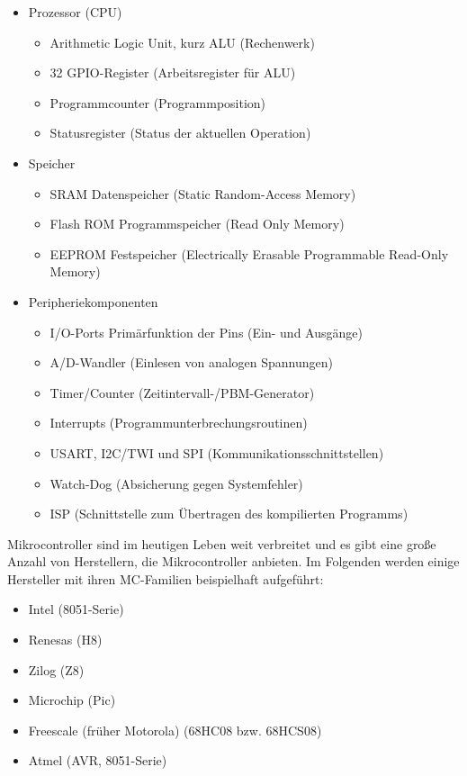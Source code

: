 \begin{itemize}
\item Prozessor (CPU)
\begin{itemize}
          \item Arithmetic Logic Unit, kurz ALU (Rechenwerk)
          \item 32 GPIO-Register (Arbeitsregister für ALU)
          \item Programmcounter (Programmposition)
					\item Statusregister (Status der aktuellen Operation) 
\end{itemize}
\item Speicher
\begin{itemize}
          \item SRAM Datenspeicher (Static Random-Access Memory)
					\item Flash ROM Programmspeicher (Read Only Memory)
					\item EEPROM Festspeicher (Electrically Erasable Programmable Read-Only Memory)
\end{itemize}
\item Peripheriekomponenten
    \begin{itemize}
          \item I/O-Ports Primärfunktion der Pins (Ein- und Ausgänge)
          \item A/D-Wandler (Einlesen von analogen Spannungen)
          \item Timer/Counter (Zeitintervall-/PBM-Generator)
					\item Interrupts (Programmunterbrechungsroutinen)
					\item USART, I2C/TWI und SPI (Kommunikationsschnittstellen)
					\item Watch-Dog (Absicherung gegen Systemfehler)
					\item ISP (Schnittstelle zum \"{U}bertragen des kompilierten Programms)
	\end{itemize}
\end{itemize}
Mikrocontroller sind im heutigen Leben weit verbreitet und es gibt eine große Anzahl von Herstellern, die Mikrocontroller anbieten.
Im Folgenden werden einige Hersteller mit ihren MC-Familien beispielhaft aufgeführt:
\begin{itemize}
\item Intel (8051-Serie)
\item Renesas (H8)
\item Zilog (Z8)
\item Microchip (Pic)
\item Freescale (früher Motorola) (68HC08 bzw. 68HCS08)
\item Atmel (AVR, 8051-Serie)
\end{itemize}
